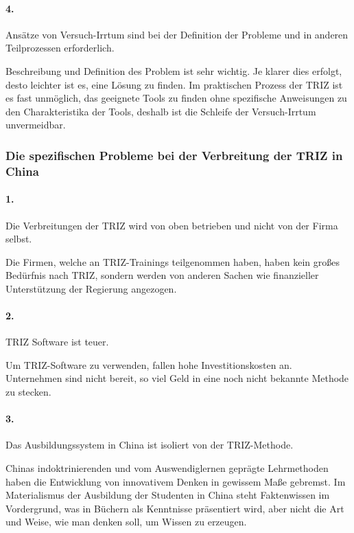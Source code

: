 \documentclass[11pt,a4paper]{article}
\begin{document}
\paragraph{4.}
Ansätze von Versuch-Irrtum sind bei der Definition der Probleme und in anderen
Teilprozessen erforderlich.

Beschreibung und Definition des Problem ist sehr wichtig. Je klarer dies
erfolgt, desto leichter ist es, eine Lösung zu finden. Im praktischen Prozess
der TRIZ ist es fast unmöglich, das geeignete Tools zu finden ohne spezifische
Anweisungen zu den Charakteristika der Tools, deshalb ist die Schleife der
Versuch-Irrtum unvermeidbar.

\subsubsection{Die spezifischen Probleme bei der Verbreitung der TRIZ in
  China} 

\paragraph{1.}
Die Verbreitungen der TRIZ wird von oben betrieben und nicht von der Firma
selbst.

Die Firmen, welche an TRIZ-Trainings teilgenommen haben, haben kein großes
Bedürfnis nach TRIZ, sondern werden von anderen Sachen wie finanzieller
Unterstützung der Regierung angezogen.

\paragraph{2.}
TRIZ Software ist teuer.

Um TRIZ-Software zu verwenden, fallen hohe Investitionskosten an.  Unternehmen
sind nicht bereit, so viel Geld in eine noch nicht bekannte Methode zu
stecken.

\paragraph{3.}
Das Ausbildungssystem in China ist isoliert von der TRIZ-Methode.

Chinas indoktrinierenden und vom Auswendiglernen geprägte Lehrmethoden haben
die Entwicklung von innovativem Denken in gewissem Maße gebremst. Im
Materialismus der Ausbildung der Studenten in China steht Faktenwissen im
Vordergrund, was in Büchern als Kenntnisse präsentiert wird, aber nicht die
Art und Weise, wie man denken soll, um Wissen zu erzeugen.
\end{document}
